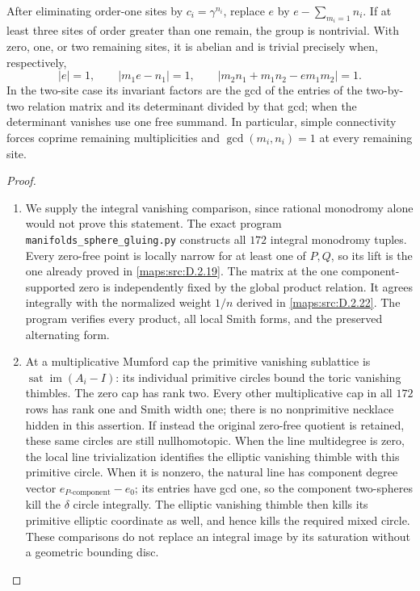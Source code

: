 \begin{theorem}
After eliminating order-one sites by $c_i=\gamma^{n_i}$, replace $e$
by $e-\sum_{m_i=1}n_i$. If at least three sites of order greater than
one remain, the group is nontrivial. With zero, one, or two remaining
sites, it is abelian and is trivial precisely when, respectively,
\[
 |e|=1,\qquad |m_1e-n_1|=1,\qquad
 |m_2n_1+m_1n_2-em_1m_2|=1.                                \tag{D.FG3}\label{maps:eq:D.FG3}
\]
In the two-site case its invariant factors are the gcd of the entries
of the two-by-two relation matrix and its determinant divided by that
gcd; when the determinant vanishes use one free summand. In particular,
simple connectivity forces coprime remaining multiplicities and
$\gcd(m_i,n_i)=1$ at every remaining site.

\end{theorem}


\begin{proof}
\begin{enumerate}[label=\arabic*.,leftmargin=*]
\item We supply the integral vanishing comparison, since rational monodromy
alone would not prove this statement. The exact program
\texttt{manifolds\_sphere\_gluing.py} constructs all $172$ integral
monodromy tuples. Every zero-free point is locally narrow for at least
one of $P,Q$, so its lift is the one already proved in \ref{maps:src:D.2.19}.
The matrix at the one component-supported zero is independently fixed
by the global product relation. It agrees integrally with the normalized
weight $1/n$ derived in \ref{maps:src:D.2.22}. The program verifies every product,
all local Smith forms, and the preserved alternating form.

\item At a multiplicative Mumford cap the primitive vanishing sublattice is
$\operatorname{sat}\operatorname{im}(A_i-I)$: its individual primitive
circles bound the toric vanishing thimbles. The zero cap has rank two.
Every other multiplicative cap in all $172$ rows has rank one and
Smith width one; there is no nonprimitive necklace hidden in this
assertion. If instead the original zero-free quotient is retained,
these same circles are still nullhomotopic. When the line multidegree
is zero, the local line trivialization identifies the elliptic vanishing
thimble with this primitive circle. When it is nonzero, the natural
line has component degree vector $e_{P\text{-component}}-e_0$;
its entries have gcd one, so the component two-spheres kill the
$\delta$ circle integrally. The elliptic vanishing thimble then kills
its primitive elliptic coordinate as well, and hence kills the required
mixed circle. These comparisons do not replace an integral image by
its saturation without a geometric bounding disc.


\end{enumerate}
\end{proof}
